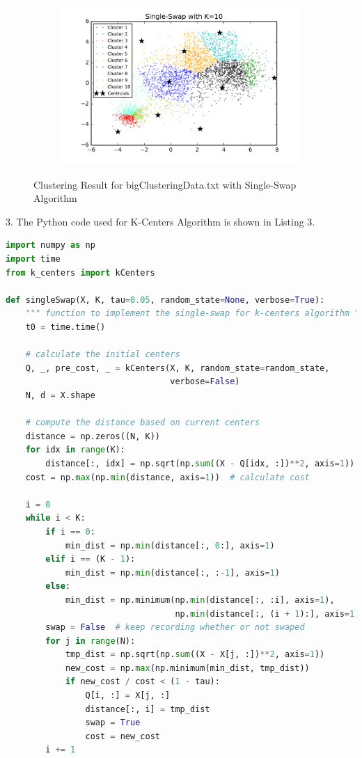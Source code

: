 \begin{description}
\begin{description}
\begin{figure}[!h]
\begin{subfigure}[b]{0.475\textwidth}
            \includegraphics[width=\textwidth]{./figures/bigClustering_singleSwap_10.png}
        \end{subfigure}
        
        \caption{Clustering Result for bigClusteringData.txt with Single-Swap Algorithm}
        \label{fig:single-swap-bigClustering}
\end{figure}

\newpage
\item{3.} The Python code used for K-Centers Algorithm is shown in Listing 3.

\begin{lstlisting}[language=Python, caption=Single-Swap Algorithm Python Code]
import numpy as np
import time
from k_centers import kCenters

def singleSwap(X, K, tau=0.05, random_state=None, verbose=True):
    """ function to implement the single-swap for k-centers algorithm """
    t0 = time.time()

    # calculate the initial centers
    Q, _, pre_cost, _ = kCenters(X, K, random_state=random_state,
                                 verbose=False)
    N, d = X.shape

    # compute the distance based on current centers
    distance = np.zeros((N, K))
    for idx in range(K):
        distance[:, idx] = np.sqrt(np.sum((X - Q[idx, :])**2, axis=1))
    cost = np.max(np.min(distance, axis=1))  # calculate cost

    i = 0
    while i < K:
        if i == 0:
            min_dist = np.min(distance[:, 0:], axis=1)
        elif i == (K - 1):
            min_dist = np.min(distance[:, :-1], axis=1)
        else:
            min_dist = np.minimum(np.min(distance[:, :i], axis=1),
                                  np.min(distance[:, (i + 1):], axis=1))
        swap = False  # keep recording whether or not swaped
        for j in range(N):
            tmp_dist = np.sqrt(np.sum((X - X[j, :])**2, axis=1))
            new_cost = np.max(np.minimum(min_dist, tmp_dist))
            if new_cost / cost < (1 - tau):
                Q[i, :] = X[j, :]
                distance[:, i] = tmp_dist
                swap = True
                cost = new_cost
        i += 1


\end{lstlisting}
\end{description}
\end{description}
